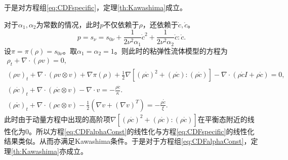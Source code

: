 \documentclass{article}
\begin{document}
	于是对方程组\eqref{eq:CDFspecific}，定理\ref{th:Kawashima}成立。

	对于$\alpha_1,\alpha_2$为常数的情况，此时$p$不仅依赖于$\rho$，还依赖于$\dot{c},\mathring{c}$。
	\begin{equation*}
		p = s_\nu = s_{0\nu} +\frac{1}{2\nu^2 \alpha_1} \dot{c}^2 +　\frac{1}{2\nu^2 \alpha_2} \mathring{c} : \mathring{c}. 
	\end{equation*}
	设$\pi= \pi(\rho) = s_{0\nu}$。取$\alpha_1=\alpha_2=1$。则此时的粘弹性流体模型的方程为   
	\begin{subequations}\label{eq:CDFalphaConst}
		\begin{align}
			\rho_t + \nabla \cdot (\rho v) = 0, \\
			(\rho v)_t + \nabla \cdot (\rho v \otimes v) + \nabla \pi(\rho) + \frac{1}{2} \nabla [ (\rho \dot{c})^2+ (\rho \mathring{c}) : (\rho \mathring{c})]- \nabla \cdot ( \rho \dot{c} I +  \rho \mathring{c}) = 0, \\
			(\rho \dot{c})_t  + \nabla \cdot(\rho \dot{c} \otimes v) -  \nabla \cdot v = - \frac{\rho \dot{c}}{\kappa}. \\
			(\rho \mathring{c})_t + \nabla \cdot (\rho c \otimes v) - \frac{1}{2} (\nabla v + (\nabla v)^T) = - \frac{\rho \mathring{c}}{\xi}.
		\end{align}
	\end{subequations}
	此时由于动量方程中出现的高阶项$\nabla [ (\rho \dot{c})^2+ (\rho \mathring{c}) : (\rho \mathring{c})]$在平衡态附近的线性化为0。所以方程\eqref{eq:CDFalphaConst}的线性化与方程\eqref{eq:CDFspecific}的线性化结果类似。从而亦满足Kawashima条件。于是对于方程组\eqref{eq:CDFalphaConst}，定理\ref{th:Kawashima}亦成立。
\end{document}
